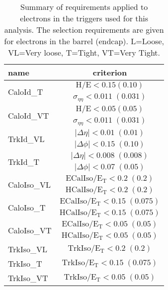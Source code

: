 \begin{table}[!ht]
 \caption{Summary of requirements applied to electrons in the triggers used for this analysis.
The selection requirements are given for electrons in the barrel (endcap).
L=Loose, VL=Very loose, T=Tight, VT=Very Tight.}
    \vspace{5pt}
 \label{tab:HLTElectronCuts}
 \centering
 \begin{tabular}{l|c}
   \hline
   name                       &  criterion \\
   \hline \hline
   \multirow{2}{*}{CaloId\_T} & $\mathrm{H/E < 0.15 (0.10) }$ \\
                               & $\sigma_{\eta\eta}\mathrm{< 0.011\;(0.031)}$ \\
    \hline
   \multirow{2}{*}{CaloId\_VT} & $\mathrm{H/E < 0.05 (0.05) }$ \\
                               & $\sigma_{\eta\eta}\mathrm{< 0.011\;(0.031)}$  \\
    \hline \hline
    \multirow{2}{*}{TrkId\_VL} & $|\Delta\eta|\mathrm{< 0.01\; (0.01)}$ \\
                               & $|\Delta\phi|\mathrm{< 0.15\;(0.10)}$  \\
    \hline
    \multirow{2}{*}{TrkId\_T} & $|\Delta\eta|\mathrm{< 0.008\; (0.008)}$ \\
                              & $|\Delta\phi|\mathrm{< 0.07\;(0.05)}$ \\
    \hline \hline
    \multirow{2}{*}{CaloIso\_VL} & $\mathrm{ECalIso/E_T <0.2\;(0.2)}$ \\
                                 & $\mathrm{HCalIso/E_T <0.2\;(0.2)}$ \\
    \hline
    \multirow{2}{*}{CaloIso\_T} & $\mathrm{ECalIso/E_T <0.15\;(0.075)}$ \\
                                 & $\mathrm{HCalIso/E_T <0.15\;(0.075)}$ \\
    \hline
    \multirow{2}{*}{CaloIso\_VT} & $\mathrm{ECalIso/E_T <0.05\;(0.05)}$ \\
                                 & $\mathrm{HCalIso/E_T <0.05\;(0.05)}$ \\
    \hline \hline
    TrkIso\_VL                   & $\mathrm{TrkIso/E_T <0.2\;(0.2)}$ \\
    \hline
    TrkIso\_T                   & $\mathrm{TrkIso/E_T <0.15\;(0.075)}$ \\
    \hline
    TrkIso\_VT                   & $\mathrm{TrkIso/E_T <0.05\;(0.05)}$ \\

\end{tabular}
\end{table}
